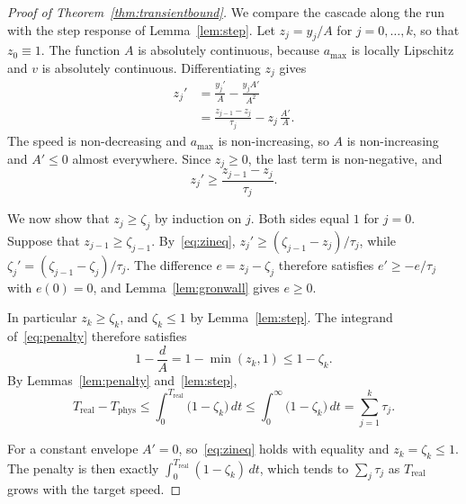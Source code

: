 \documentclass[12pt, twoside]{amsart}
\theoremstyle{definition}
\newcommand{\amax}{a_{\max}}
\begin{document}
\begin{proof}[Proof of Theorem~\ref{thm:transientbound}]
We compare the cascade along the run with the step response of Lemma~\ref{lem:step}. Let
$z_j=y_j/A$ for $j=0,\dots,k$, so that $z_0\equiv1$. The function $A$ is absolutely continuous,
because $\amax$ is locally Lipschitz and $v$ is absolutely continuous. Differentiating $z_j$ gives
\begin{align*}
z_j'&=\frac{y_j'}{A}-\frac{y_jA'}{A^2}\\
&=\frac{z_{j-1}-z_j}{\tau_j}-z_j\,\frac{A'}{A}.
\end{align*}
The speed is non-decreasing and $\amax$ is non-increasing, so $A$ is non-increasing and $A'\le0$
almost everywhere. Since $z_j\ge0$, the last term is non-negative, and
\begin{equation}\label{eq:zineq}
z_j'\ge\frac{z_{j-1}-z_j}{\tau_j}.
\end{equation}

We now show that $z_j\ge\zeta_j$ by induction on $j$. Both sides equal $1$ for $j=0$. Suppose that
$z_{j-1}\ge\zeta_{j-1}$. By~\eqref{eq:zineq}, $z_j'\ge(\zeta_{j-1}-z_j)/\tau_j$, while
$\zeta_j'=(\zeta_{j-1}-\zeta_j)/\tau_j$. The difference $e=z_j-\zeta_j$ therefore satisfies
$e'\ge-e/\tau_j$ with $e(0)=0$, and Lemma~\ref{lem:gronwall} gives $e\ge0$.

In particular $z_k\ge\zeta_k$, and $\zeta_k\le1$ by Lemma~\ref{lem:step}. The integrand
of~\eqref{eq:penalty} therefore satisfies
\[
1-\frac dA=1-\min(z_k,1)\le1-\zeta_k .
\]
By Lemmas~\ref{lem:penalty} and~\ref{lem:step},
\[
T_{\mathrm{real}}-T_{\mathrm{phys}}\le\int_0^{T_{\mathrm{real}}}\big(1-\zeta_k\big)\,dt
\le\int_0^\infty\big(1-\zeta_k\big)\,dt=\sum_{j=1}^k\tau_j .
\]

For a constant envelope $A'=0$, so~\eqref{eq:zineq} holds with equality and $z_k=\zeta_k\le1$. The
penalty is then exactly $\int_0^{T_{\mathrm{real}}}(1-\zeta_k)\,dt$, which tends to $\sum_j\tau_j$ as
$T_{\mathrm{real}}$ grows with the target speed.
\end{proof}
\end{document}
